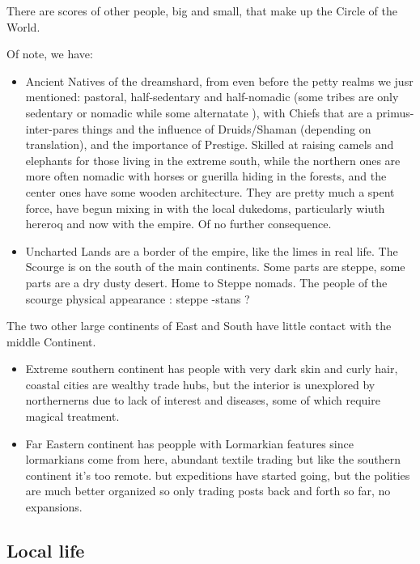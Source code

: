 There are scores of other people, big and small, that make up the Circle of the World.

Of note, we have:

\begin{itemize}
    \item Ancient Natives of the dreamshard, from even before the petty realms we jusr mentioned: pastoral, half-sedentary and half-nomadic (some tribes are only sedentary or nomadic while some alternatate ), with Chiefs that are a primus-inter-pares things and the influence of Druids/Shaman (depending on translation), and the importance of Prestige. Skilled at raising camels and elephants for those living in the extreme south, while the northern ones are more often nomadic with horses or guerilla hiding in the forests, and the center ones have some wooden architecture. They are pretty much a spent force, have begun mixing in with the local dukedoms, particularly wiuth hereroq and now with the empire. Of no further consequence.
    \item Uncharted Lands are a border of the empire, like the limes in real life. The Scourge is on the south of the main continents. Some parts are steppe, some parts are a dry dusty desert. Home to Steppe nomads. The people of the scourge physical appearance : steppe -stans ?
\end{itemize}

The two other large continents of East and South have little contact with the middle Continent.

\begin{itemize}
    \item Extreme southern continent has people with very dark skin and curly hair, coastal cities are wealthy trade hubs, but the interior is unexplored by northernerns due to lack of interest and diseases, some of which require magical treatment.
    \item Far Eastern continent has peopple with Lormarkian features since lormarkians come from here, abundant textile trading but like the southern continent it's too remote. but expeditions have started going, but the polities are much better organized so only trading posts back and forth so far, no expansions.
\end{itemize}




\subsection{Local life}


